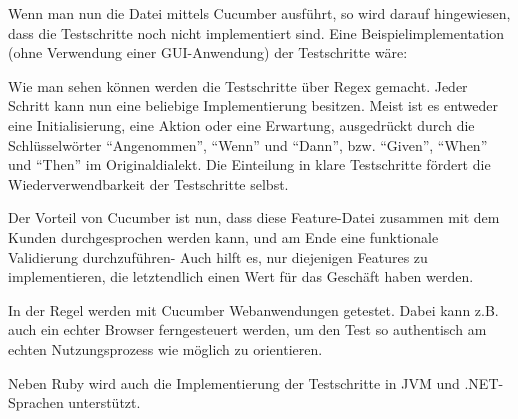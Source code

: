 

Wenn man nun die Datei mittels Cucumber ausführt, so wird darauf hingewiesen, dass die Testschritte noch nicht implementiert sind.
Eine Beispielimplementation (ohne Verwendung einer GUI-Anwendung) der Testschritte wäre:



Wie man sehen können werden die Testschritte über Regex gemacht. Jeder Schritt kann nun eine beliebige Implementierung besitzen. Meist ist es entweder eine Initialisierung, eine Aktion oder eine Erwartung, ausgedrückt durch die Schlüsselwörter "`Angenommen"', "`Wenn"' und "`Dann"', bzw. "`Given"', "`When"' und "`Then"' im Originaldialekt. Die Einteilung in klare Testschritte fördert die Wiederverwendbarkeit der Testschritte selbst.

Der Vorteil von Cucumber ist nun, dass diese Feature-Datei zusammen mit dem Kunden durchgesprochen werden kann, und am Ende eine funktionale Validierung durchzuführen- Auch hilft es, nur diejenigen Features zu implementieren, die letztendlich einen Wert für das Geschäft haben werden. 
 
In der Regel werden mit Cucumber Webanwendungen getestet. Dabei kann z.B. auch ein echter Browser ferngesteuert werden, um den Test so authentisch am echten Nutzungsprozess wie möglich zu orientieren. 

Neben Ruby wird auch die Implementierung der Testschritte in JVM und .NET-Sprachen unterstützt.